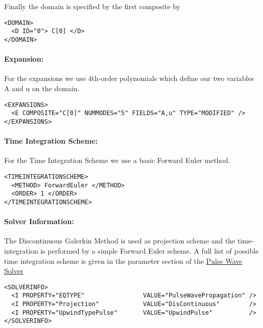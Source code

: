 Finally the domain is specified by the first composite by
\begin{lstlisting}[style=XMLStyle]
<DOMAIN> 
  <D ID="0"> C[0] </D>
</DOMAIN>
\end{lstlisting}

\paragraph{Expansion:~}For the expansions we use 4th-order polynomials which define our two variables A and u on the domain. 

\begin{lstlisting}[style=XMLStyle]
<EXPANSIONS>
  <E COMPOSITE="C[0]" NUMMODES="5" FIELDS="A,u" TYPE="MODIFIED" />
</EXPANSIONS>
\end{lstlisting}

\paragraph{Time Integration Scheme:~} For the Time Integration Scheme
we use a basic Forward Euler method.

\begin{lstlisting}[style=XMLStyle] 
<TIMEINTEGRATIONSCHEME>
  <METHOD> ForwardEuler </METHOD>
  <ORDER> 1 </ORDER>
</TIMEINTEGRATIONSCHEME>
\end{lstlisting}
        
\paragraph{Solver Information:~}The Discontinuous Galerkin Method is used as projection scheme and the time-integration is performed by a simple Forward Euler scheme. A full list of possible time integration scheme is given in the parameter section of the  \hyperref[PulseWaveSolver]{Pulse Wave Solver}

\begin{lstlisting}[style=XMLStyle] 
<SOLVERINFO>
  <I PROPERTY="EQTYPE"                VALUE="PulseWavePropagation" />
  <I PROPERTY="Projection"            VALUE="DisContinuous"        />
  <I PROPERTY="UpwindTypePulse"       VALUE="UpwindPulse"          /> 
</SOLVERINFO>
\end{lstlisting}

